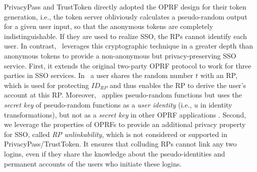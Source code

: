 PrivacyPass and TrustToken directly adopted the OPRF design for their token generation, i.e., the token server obliviously calculates a pseudo-random output for a given user input,
so that the anonymous tokens are completely indistinguishable.
If they are used to realize SSO, the RPs cannot identify each user.
In contrast, \usso\ leverages this cryptographic technique in a greater depth than anonymous tokens to provide a non-anonymous but privacy-preserving SSO service. First, it extends the original two-party OPRF protocol to work for three parties in SSO services.
In \usso\ a user shares the random number $t$ with an RP, which is used for protecting $ID_{RP}$ and thus enables the RP to derive the user's account at this RP.
Moreover, \usso\ applies pseudo-random functions but uses the \emph{secret key} of pseudo-random functions as a \emph{user identity} (i.e., $u$ in identity transformations),
    but not as a \emph{secret key} in other OPRF applications \cite{privacypass,trusttoken,strong-oprf,oprf-bitcoin-wallet,pesto,oprf-ot-si,pp-ss,Private-Contact-Discovery,o-kms,oprf-deduplication}.
Second, we leverage the properties of OPRFs
 to provide an additional privacy property for SSO, called \emph{RP unlinkability}, which is not considered or supported in PrivacyPass/TrustToken.
 It ensures that colluding RPs cannot link any two logins,
  even if they share the knowledge about the pseudo-identities and permanent accounts of the users who initiate these logins.


